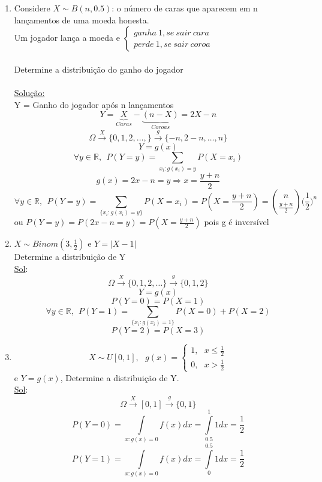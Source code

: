 \documentclass[a4paper,12pt]{article}
\begin{document}
\begin{enumerate}[label=\arabic*)]
	\item Considere $X\sim B(n,0.5)$: o número de caras que aparecem em n lançamentos de uma moeda honesta.\\
	Um jogador lança a moeda e 
	$\begin{cases}
		ganha \ 1, se\ sair\ cara\\
		perde\ 1, se\ sair\ coroa
	\end{cases}$  \\
	\\
	Determine a distribuição do ganho do jogador\\
	\\
	\underline{Solução:}\\
	Y = Ganho do jogador após n lançamentos
 $$Y=\underbrace{X}_{Caras}-\underbrace{(n-X)}_{Coroas} = 2X-n$$
 $$\Omega \overset{X}{\longrightarrow}  \{0,1,2,\ldots,\}\overset{g}{\longrightarrow} \{-n,2-n,\ldots,n\} $$
 $$Y=g(x) $$
 $$\forall y\in \mathbb R, \ \ P(Y=y)= \sum\limits_{x_i:g(x_i)=y} P(X=x_i)$$
 $$ g(x)=2x-n =y\Rightarrow x = \frac{y+n}{2}$$
  $$\forall y\in \mathbb R, \ \ P(Y=y)= \sum\limits_{\{x_i:g(x_i)=y\}} P(X=x_i)= P(X=\frac{y+n}{2})= 
  \binom{n}{\frac{y+n}{2}} \bigg(\frac{1}{2}\bigg)^n$$
  ou 
  $P(Y=y)= P(2x-n=y)=P(X=\frac{y+n}{2}) $
  	pois g é inversível 
  	
  	\item 
  	$X\sim Binom(3,\frac{1}{2}) $ e $Y=|X-1|$\\
  	Determine a distribuição de Y\\
  	\underline{Sol}:
  	$$\Omega \overset{X}{\longrightarrow}  \{0,1,2,\ldots\}\overset{g}{\longrightarrow} \{0,1,2\} $$
  $$Y=g(x) $$
  $$P(Y=0)=P(X=1) $$
    $$\forall y\in \mathbb R, \ \ P(Y=1)= \sum\limits_{\{x_i:g(x_i)=1\}} P(X=0)+P(X=2)$$
    $$P(Y=2)=P(X=3)$$
    \newpage
    \item $$X\sim U[0,1],  \ \ \ g(x)=\begin{cases}
  1,  \ \ \ x\le \frac{1}{2}\\
  0,\ \ \  x>\frac{1}{2}
    \end{cases} $$
    e $Y=g(x) $, Determine a distribuição de Y.\\
    \underline{Sol}:
    $$\Omega \overset{X}{\longrightarrow} [0,1] \overset{g}{\longrightarrow} \{0,1\}  $$
    $$P(Y=0)= \int\limits_{x:g(x)=0}f(x) dx = \int\limits_{0.5}^1 1 dx= \frac{1}{2}$$
        $$P(Y=1)= \int\limits_{x:g(x)=0}f(x) dx = \int\limits_{0}^{0.5} 1dx = \frac{1}{2}$$
        

\end{enumerate}
\end{document}

